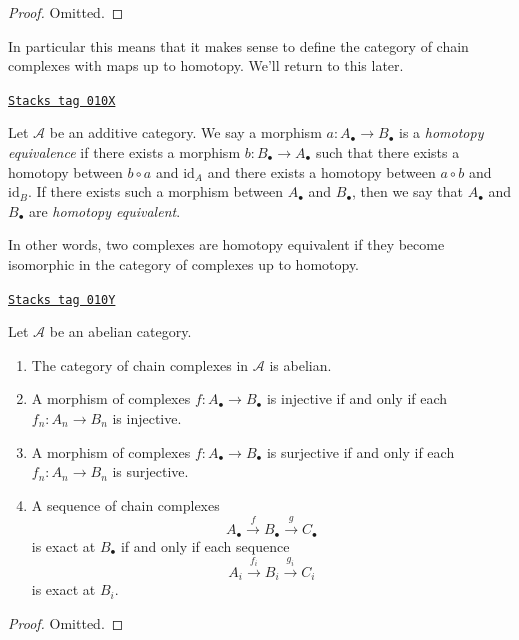 \begin{proof}
Omitted.
\end{proof}

In particular this means that it makes sense to define
the category of chain complexes with maps up to homotopy.
We'll return to this later.

\begin{definition}
\label{homology-definition-homotopy-equivalent}
\href{https://stacks.math.columbia.edu/tag/010X}{\texttt{Stacks tag 010X}}

Let $\mathcal{A}$ be an additive category.
We say a morphism $a : A_\bullet \to B_\bullet$
is a {\it homotopy equivalence} if there exists
a morphism $b : B_\bullet \to A_\bullet$
such that there exists a homotopy between
$b \circ a$ and $\text{id}_A$
and there exists a homotopy between $a \circ b$ and $\text{id}_B$.
If there exists such a morphism between $A_\bullet$ and $B_\bullet$, then
we say that $A_\bullet$ and $B_\bullet$ are {\it homotopy equivalent}.
\end{definition}

In other words, two complexes are homotopy equivalent if they become
isomorphic in the category of complexes up to homotopy.

\begin{lemma}
\label{homology-lemma-cat-chain-abelian}
\href{https://stacks.math.columbia.edu/tag/010Y}{\texttt{Stacks tag 010Y}}

Let $\mathcal{A}$ be an abelian category.
\begin{enumerate}
\item The category of chain complexes in $\mathcal{A}$ is
abelian.
\item A morphism of complexes
$f : A_\bullet \to B_\bullet$ is injective
if and only if each $f_n : A_n \to B_n$ is injective.
\item A morphism of complexes
$f : A_\bullet \to B_\bullet$ is surjective
if and only if each $f_n : A_n \to B_n$ is surjective.
\item A sequence of chain complexes
$$
A_\bullet \xrightarrow{f} B_\bullet \xrightarrow{g} C_\bullet
$$
is exact at $B_\bullet$ if and only if each sequence
$$
A_i \xrightarrow{f_i} B_i \xrightarrow{g_i} C_i
$$
is exact at $B_i$.
\end{enumerate}
\end{lemma}

\begin{proof}
Omitted.
\end{proof}

